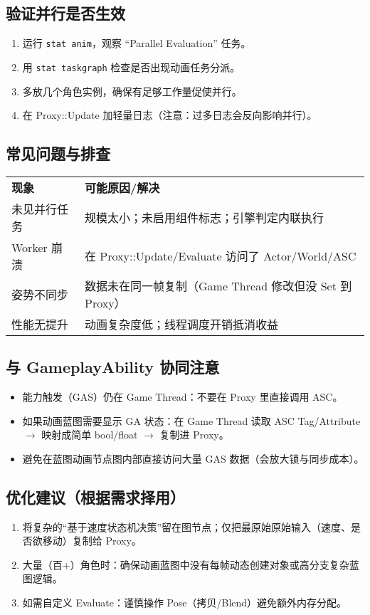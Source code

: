 \documentclass[10pt,openright,oneside,CJKmath]{MyBook}
\begin{document}
\subsection{验证并行是否生效}
\begin{enumerate}
  \item 运行 \texttt{stat anim}，观察 “Parallel Evaluation” 任务。
  \item 用 \texttt{stat taskgraph} 检查是否出现动画任务分派。
  \item 多放几个角色实例，确保有足够工作量促使并行。
  \item 在 Proxy::Update 加轻量日志（注意：过多日志会反向影响并行）。
\end{enumerate}

\subsection{常见问题与排查}
\begin{tabular}{p{4.2cm} p{10cm}}
\textbf{现象} & \textbf{可能原因/解决} \\
未见并行任务 & 规模太小；未启用组件标志；引擎判定内联执行 \\
Worker 崩溃 & 在 Proxy::Update/Evaluate 访问了 Actor/World/ASC \\
姿势不同步 & 数据未在同一帧复制（Game Thread 修改但没 Set 到 Proxy） \\
性能无提升 & 动画复杂度低；线程调度开销抵消收益 \\
\end{tabular}

\subsection{与 GameplayAbility 协同注意}
\begin{itemize}
  \item 能力触发（GAS）仍在 Game Thread：不要在 Proxy 里直接调用 ASC。
  \item 如果动画蓝图需要显示 GA 状态：在 Game Thread 读取 ASC Tag/Attribute $\rightarrow$ 映射成简单 bool/float $\rightarrow$ 复制进 Proxy。
  \item 避免在蓝图动画节点图内部直接访问大量 GAS 数据（会放大锁与同步成本）。
\end{itemize}

\subsection{优化建议（根据需求择用）}
\begin{enumerate}
  \item 将复杂的“基于速度状态机决策”留在图节点；仅把最原始原始输入（速度、是否欲移动）复制给 Proxy。
  \item 大量（百+）角色时：确保动画蓝图中没有每帧动态创建对象或高分支复杂蓝图逻辑。
  \item 如需自定义 Evaluate：谨慎操作 Pose（拷贝/Blend）避免额外内存分配。
\end{enumerate}
\end{document}
